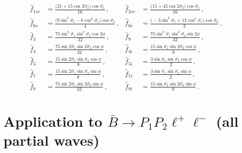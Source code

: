 \documentclass[aps,prd,reprint,nofootinbib,preprintnumbers]{revtex4}
\renewcommand{\theta}{\vartheta}
\begin{document}
\begin{equation}
\begin{aligned}
    \hat{f}_{1sc}& = \frac{\big(21 + 15 \cos2\theta_2\big)\cos\theta_1}{16}               \,,&
    \hat{f}_{2sc}& = \frac{\big(15 + 45 \cos2\theta_2\big)\cos\theta_1}{16}               \,,\\
    \hat{f}_{6s} & = \frac{\big( 9\sin^2\theta_1 -  6 \cos^2\theta_1\big)\cos\theta_2}{4} \,,&
    \hat{f}_{6c} & = \frac{\big(-3\sin^2\theta_1 + 12 \cos^2\theta_1\big)\cos\theta_2}{2} \,,\\
    \hat{f}_{3}  & = \frac{75 \sin^2\theta_1 \sin^2\theta_2 \cos2\phi}{32}                \,,&
    \hat{f}_{9}  & = \frac{75 \sin^2\theta_1 \sin^2\theta_2 \sin2\phi}{32}                \,,\\
    \hat{f}_{4}  & = \frac{75 \sin 2\theta_1 \sin 2\theta_2 \cos \phi}{32}                \,,&
    \hat{f}_{4i} & = \frac{15 \sin  \theta_1 \sin 2\theta_2 \cos \phi}{8}                 \,,\\
    \hat{f}_{5}  & = \frac{15 \sin 2\theta_1 \sin  \theta_2 \cos \phi}{8}                 \,,&
    \hat{f}_{5i} & = \frac{3  \sin  \theta_1 \sin  \theta_2 \cos \phi}{2}                 \,,\\
    \hat{f}_{7}  & = \frac{15 \sin 2\theta_1 \sin  \theta_2 \sin \phi}{8}                 \,,&
    \hat{f}_{7i} & = \frac{3  \sin  \theta_1 \sin  \theta_2 \sin \phi}{2}                 \,,\\
    \hat{f}_{8}  & = \frac{75 \sin 2\theta_1 \sin 2\theta_2 \sin \phi}{32}                \,,&
    \hat{f}_{8i} & = \frac{15 \sin  \theta_1 \sin 2\theta_2 \sin \phi}{8}                 \,.
\end{aligned}
\end{equation}

\section{Application to $\bar{B}\to P_1 P_2\ell^+\ell^-$ (all partial waves)}
\label{app:btokpill}
\end{document}

